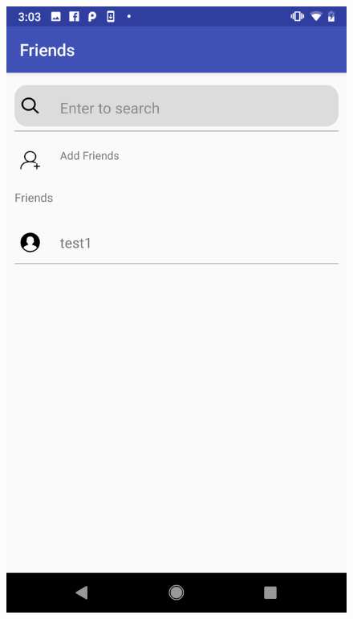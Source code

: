 \begin{figure}[H]
\centering
\begin{minipage}[t]{0.45\textwidth}
\includegraphics[width=.95\textwidth]{section03/assets/FriendsList.png}
\subcaption{\label{FriendsListUI}}
\end{minipage}%
\begin{minipage}[t]{0.45\textwidth}

\end{minipage}
\end{figure}
